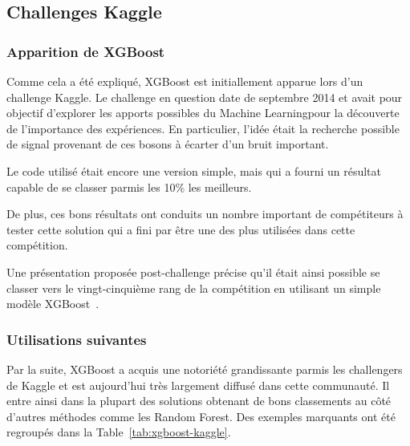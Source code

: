\subsection{Challenges Kaggle}
\subsubsection{Apparition de XGBoost}
Comme cela a été expliqué, XGBoost est initiallement apparue lors d'un challenge Kaggle. Le challenge en question date de septembre 2014 et avait pour objectif d'explorer les apports possibles du Machine Learningpour la découverte de l'importance des expériences. En particulier, l'idée était la recherche possible de signal provenant de ces bosons à écarter d'un bruit important.

Le code utilisé était encore une version simple, mais qui a fourni un résultat capable de se classer parmis les 10\% les meilleurs.

De plus, ces bons résultats ont conduits un nombre important de compétiteurs à tester cette solution qui a fini par être une des plus utilisées dans cette compétition.

Une présentation proposée post-challenge précise qu'il était ainsi possible se classer vers le vingt-cinquième rang de la compétition en utilisant un simple modèle XGBoost~\cite{bib:higgs-presentation}.

\subsubsection{Utilisations suivantes}
Par la suite, XGBoost a acquis une notoriété grandissante parmis les challengers de Kaggle et est aujourd'hui très largement diffusé dans cette communauté. Il entre ainsi dans la plupart des solutions obtenant de bons classements au côté d'autres méthodes comme les Random Forest. Des exemples marquants ont été regroupés dans la Table~\ref{tab:xgboost-kaggle}.

